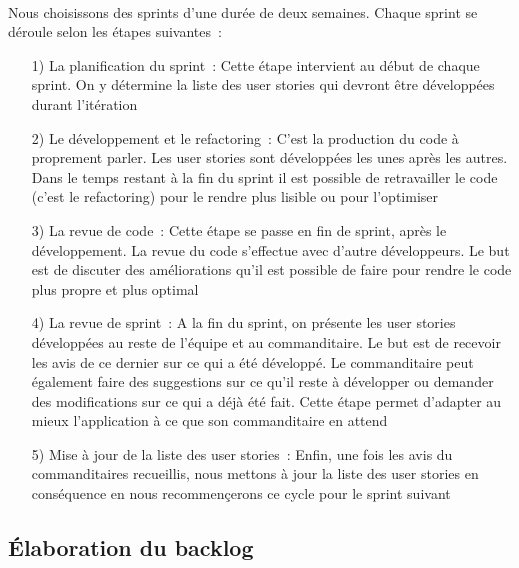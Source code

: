 			\paragraph{}%
			Nous choisissons des sprints d'une durée de deux semaines. Chaque sprint se
			déroule selon les étapes suivantes~:
			\begin{itemize}
			  \item[1) La planification du sprint~:] Cette étape intervient au début de
			  chaque sprint. On y détermine la liste des user stories qui devront être
			  développées durant l'itération
			  \item[2) Le développement et le refactoring~:] C'est la production du code
			  à proprement parler. Les user stories sont développées les unes après les
			  autres. Dans le temps restant à la fin du sprint il est possible de
			  retravailler le code (c'est le refactoring) pour le rendre plus lisible ou
			  pour l'optimiser
			  \item[3) La revue de code~:] Cette étape se passe en fin de sprint, après
			  le développement. La revue du code s'effectue avec d'autre développeurs. Le
			  but est de discuter des améliorations qu'il est possible de faire pour
			  rendre le code plus propre et plus optimal
			  \item[4) La revue de sprint~:] A la fin du sprint, on présente les user
			  stories développées au reste de l'équipe et au commanditaire. Le but est de
			  recevoir les avis de ce dernier sur ce qui a été développé. Le
			  commanditaire peut également faire des suggestions sur ce qu'il reste à
			  développer ou demander des modifications sur ce qui a déjà été fait. Cette
			  étape permet d'adapter au mieux l'application à ce que son commanditaire en
			  attend
			  \item[5) Mise à jour de la liste des user stories~:] Enfin, une fois les
			  avis du commanditaires recueillis, nous mettons à jour la liste des user
			  stories en conséquence en nous recommençerons ce cycle pour le sprint
			  suivant
			\end{itemize}
		
		\subsection{Élaboration du backlog}
